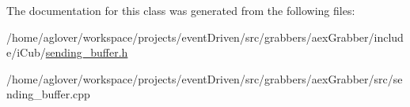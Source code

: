 The documentation for this class was generated from the following files\-:\begin{DoxyCompactItemize}
\item 
/home/aglover/workspace/projects/event\-Driven/src/grabbers/aex\-Grabber/include/i\-Cub/\hyperlink{sending__buffer_8h}{sending\-\_\-buffer.\-h}\item 
/home/aglover/workspace/projects/event\-Driven/src/grabbers/aex\-Grabber/src/sending\-\_\-buffer.\-cpp\end{DoxyCompactItemize}
